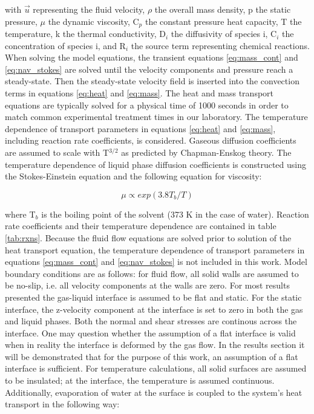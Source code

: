 with $\vec{u}$ representing the fluid velocity, $\rho$ the overall mass density, p the static pressure, $\mu$ the dynamic viscosity, C$_p$ the constant pressure heat capacity, T the temperature, k the thermal conductivity, D$_i$ the diffusivity of species i, C$_i$ the concentration of species i, and R$_i$ the source term representing chemical reactions. When solving the model equations, the transient equations \ref{eq:mass_cont} and \ref{eq:nav_stokes} are solved until the velocity components and pressure reach a steady-state. Then the steady-state velocity field is inserted into the convection terms in equations \ref{eq:heat} and \ref{eq:mass}. The heat and mass transport equations are typically solved for a physical time of 1000 seconds in order to match common experimental treatment times in our laboratory. The temperature dependence of transport parameters in equations \ref{eq:heat} and \ref{eq:mass}, including reaction rate coefficients, is considered. Gaseous diffusion coefficients are assumed to scale with T$^{3/2}$ as predicted by Chapman-Enskog theory. \cite[p. 119]{cussler2009diffusion} The temperature dependence of liquid phase diffusion coefficients is constructed using the Stokes-Einstein equation \cite[p. 529]{bird2007transport} and the following equation for viscosity: \cite[p. 31]{bird2007transport}

\begin{equation}
	\mu \propto exp(3.8T_b/T)
	\label{eq:viscosityTempDependence}
\end{equation}

where T$_b$ is the boiling point of the solvent (373 K in the case of water). Reaction rate coefficients and their temperature dependence are contained in table \ref{tab:rxns}. Because the fluid flow equations are solved prior to solution of the heat transport equation, the temperature dependence of transport parameters in equations \ref{eq:mass_cont} and \ref{eq:nav_stokes} is not included in this work. Model boundary conditions are as follows: for fluid flow, all solid walls are assumed to be no-slip, i.e. all velocity components at the walls are zero. For most results presented the gas-liquid interface is assumed to be flat and static. For the static interface, the z-velocity component at the interface is set to zero in both the gas and liquid phases. Both the normal and shear stresses are continous across the interface. One may question whether the assumption of a flat interface is valid when in reality the interface is deformed by the gas flow. In the results section it will be demonstrated that for the purpose of this work, an assumption of a flat interface is sufficient. For temperature calculations, all solid surfaces are assumed to be insulated; at the interface, the temperature is assumed continuous. Additionally, evaporation of water at the surface is coupled to the system's heat transport in the following way: \cite{bird2007transport}

